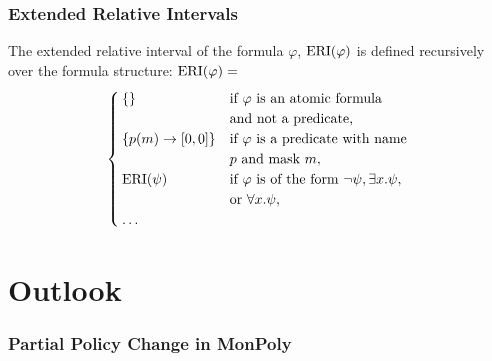 \documentclass{beamer}
\begin{document}
\begin{frame}
    \frametitle{Extended Relative Intervals}
    \begin{definition}
        \label{def:e-rel-int}
        The extended relative interval of the formula $\varphi$, $\operatorname{ERI}(\varphi)$ is defined recursively over the formula structure:
        $\operatorname{ERI}(\varphi) =$
        \begin{equation*}
            \begin{cases}
                \{\} 
                    & \text{if } \varphi \text{ is an atomic formula} \\
                    & \text{and not a predicate,} \\ 
                \{p(m) \rightarrow [0,0]\} 
                    & \text{if } \varphi \text{ is a predicate with name } \\
                    & p \text{ and mask } m, \\
                \operatorname{ERI}(\psi) 
                    & \text{if } \varphi \text{ is of the form } \neg \psi, \exists x.\psi, \\
                    & \text{or } \forall x.\psi, \\
                \dots
            \end{cases}
        \end{equation*}
    \end{definition}
    
\end{frame}

\section{Outlook}

\begin{frame}
    \frametitle{Partial Policy Change in MonPoly}

    
\end{frame}
\end{document}

